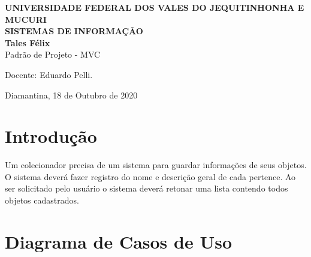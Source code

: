 \documentclass[a4paper]{article}
\begin{document}
  \begin{titlepage}
    \vfill
      \begin{center}
        {\large \textbf{UNIVERSIDADE FEDERAL DOS VALES DO JEQUITINHONHA E MUCURI}} \\[0.5cm]
        {\large \textbf{SISTEMAS DE INFORMAÇÃO}} \\[4cm]
    
        {\large \textbf{Tales Félix}}\\[4cm]
    
        {\Large Padrão de Projeto - MVC }\\[4cm]
    
        \hspace{.45\textwidth} %
        \begin{minipage}{.5\textwidth}
        \large
        Docente: Eduardo Pelli.\\[8cm]
    \end{minipage}
    {\large Diamantina, 18 de Outubro de 2020}
    \end{center}
  \end{titlepage}


  \newpage
    \section{Introdução}
    Um colecionador precisa de um sistema para guardar informações de seus objetos.
    O sistema deverá fazer registro do nome e descrição geral de cada pertence.
    Ao ser solicitado pelo usuário o sistema deverá retonar uma lista contendo
    todos objetos cadastrados.
    
    
    
    \section{Diagrama de Casos de Uso}

    \\
\end{document}
